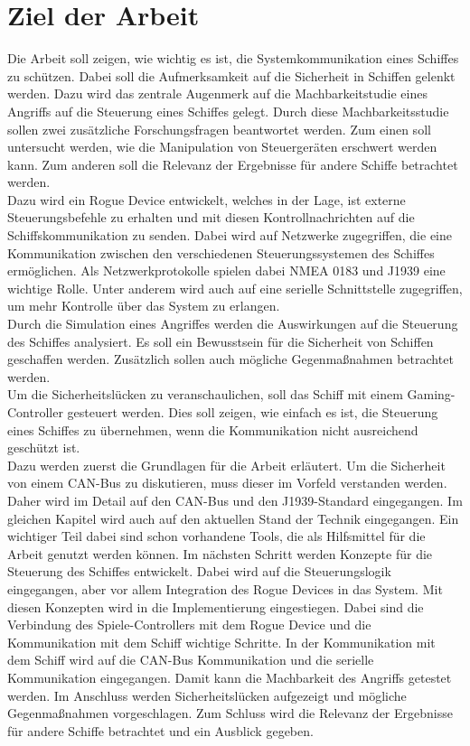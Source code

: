 \section{Ziel der Arbeit}
Die Arbeit soll zeigen, wie wichtig es ist, die Systemkommunikation eines Schiffes zu schützen.
Dabei soll die Aufmerksamkeit auf die Sicherheit in Schiffen gelenkt werden.
Dazu wird das zentrale Augenmerk auf die Machbarkeitstudie eines Angriffs auf die Steuerung eines Schiffes gelegt.
Durch diese Machbarkeitsstudie sollen zwei zusätzliche Forschungsfragen beantwortet werden.
Zum einen soll untersucht werden, wie die Manipulation von Steuergeräten erschwert werden kann.
Zum anderen soll die Relevanz der Ergebnisse für andere Schiffe betrachtet werden. \\
Dazu wird ein Rogue Device entwickelt, welches in der 
Lage, ist externe Steuerungsbefehle zu erhalten und mit diesen Kontrollnachrichten auf die Schiffskommunikation zu senden.
Dabei wird auf Netzwerke zugegriffen, die eine Kommunikation zwischen den verschiedenen Steuerungssystemen des Schiffes 
ermöglichen. Als Netzwerkprotokolle spielen dabei NMEA 0183 und J1939 eine wichtige Rolle. Unter anderem wird auch 
auf eine serielle Schnittstelle zugegriffen, um mehr Kontrolle über das System zu erlangen. \\
Durch die Simulation eines Angriffes werden die Auswirkungen auf die Steuerung des 
Schiffes analysiert. Es soll ein Bewusstsein für die Sicherheit von Schiffen geschaffen werden. Zusätzlich 
sollen auch mögliche Gegenmaßnahmen betrachtet werden. \\
Um die Sicherheitslücken zu veranschaulichen, soll das Schiff mit einem Gaming-Controller gesteuert werden.
Dies soll zeigen, wie einfach es ist, die Steuerung eines Schiffes zu übernehmen, wenn die Kommunikation nicht 
ausreichend geschützt ist.\\
Dazu werden zuerst die Grundlagen für die Arbeit erläutert. 
Um die Sicherheit von einem CAN-Bus zu diskutieren, muss dieser im Vorfeld verstanden werden. Daher wird
im Detail auf den CAN-Bus und den J1939-Standard eingegangen.
Im gleichen Kapitel wird auch auf den aktuellen Stand der Technik eingegangen.
Ein wichtiger Teil dabei sind schon vorhandene Tools, die als Hilfsmittel für die Arbeit genutzt werden können.
Im nächsten Schritt werden Konzepte für die Steuerung des Schiffes entwickelt. Dabei wird auf die Steuerungslogik eingegangen, aber
vor allem Integration des Rogue Devices in das System. Mit diesen Konzepten wird in die Implementierung eingestiegen. Dabei sind 
die Verbindung des Spiele-Controllers mit dem Rogue Device und die Kommunikation mit dem Schiff wichtige Schritte.
In der Kommunikation mit dem Schiff wird auf die CAN-Bus Kommunikation und die serielle Kommunikation eingegangen.
Damit kann die Machbarkeit des Angriffs getestet werden. Im Anschluss werden Sicherheitslücken aufgezeigt und mögliche Gegenmaßnahmen
vorgeschlagen. Zum Schluss wird die Relevanz der Ergebnisse für andere Schiffe betrachtet und ein Ausblick gegeben. \\
